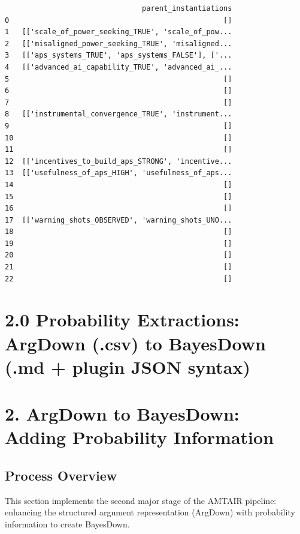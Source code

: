 \documentclass[
  11pt,
  letterpaper,
]{book}
\begin{document}
\begin{verbatim}
                                parent_instantiations  
0                                                  []  
1   [['scale_of_power_seeking_TRUE', 'scale_of_pow...  
2   [['misaligned_power_seeking_TRUE', 'misaligned...  
3   [['aps_systems_TRUE', 'aps_systems_FALSE'], ['...  
4   [['advanced_ai_capability_TRUE', 'advanced_ai_...  
5                                                  []  
6                                                  []  
7                                                  []  
8   [['instrumental_convergence_TRUE', 'instrument...  
9                                                  []  
10                                                 []  
11                                                 []  
12  [['incentives_to_build_aps_STRONG', 'incentive...  
13  [['usefulness_of_aps_HIGH', 'usefulness_of_aps...  
14                                                 []  
15                                                 []  
16                                                 []  
17  [['warning_shots_OBSERVED', 'warning_shots_UNO...  
18                                                 []  
19                                                 []  
20                                                 []  
21                                                 []  
22                                                 []  
\end{verbatim}

\chapter{2.0 Probability Extractions: ArgDown (.csv) to BayesDown (.md +
plugin JSON
syntax)}\label{probability-extractions-argdown-.csv-to-bayesdown-.md-plugin-json-syntax}

\chapter{2. ArgDown to BayesDown: Adding Probability
Information}\label{argdown-to-bayesdown-adding-probability-information}

\section{Process Overview}\label{process-overview-1}

This section implements the second major stage of the AMTAIR pipeline:
enhancing the structured argument representation (ArgDown) with
probability information to create BayesDown.
\end{document}
